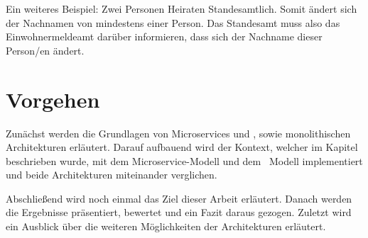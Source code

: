 Ein weiteres Beispiel: Zwei Personen Heiraten Standesamtlich. Somit ändert sich der Nachnamen von mindestens einer Person. Das Standesamt muss also das Einwohnermeldeamt darüber informieren, dass sich der Nachname dieser Person/en ändert.
\section{Vorgehen}
Zunächst werden die Grundlagen von Microservices und \SOA , sowie monolithischen Architekturen erläutert. Darauf aufbauend wird der Kontext, welcher im Kapitel  beschrieben wurde, mit dem Microservice-Modell und dem \SOA\ Modell implementiert und beide Architekturen miteinander verglichen.

Abschließend wird noch einmal das Ziel dieser Arbeit erläutert. Danach werden die Ergebnisse präsentiert, bewertet und ein Fazit daraus gezogen. Zuletzt wird ein Ausblick über die weiteren Möglichkeiten der Architekturen erläutert.